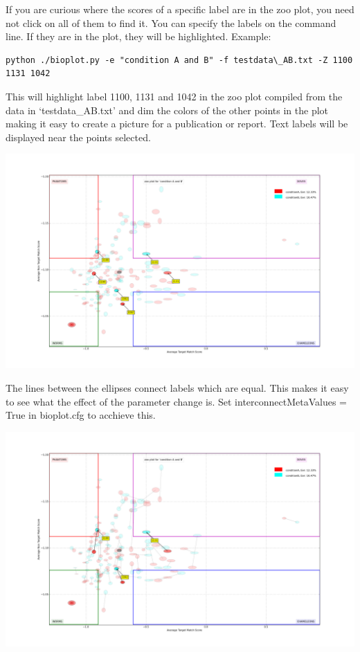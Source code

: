\documentclass[letterpaper,10pt,english]{sphinxmanual}
\begin{document}
If you are curious where the scores of a specific label are in the zoo plot, you need
not click on all of them to find it. You can specify the labels on the command line.
If they are in the plot, they will be highlighted. Example:

\begin{Verbatim}[commandchars=\\\{\}]
python ./bioplot.py -e "condition A and B" -f testdata\_AB.txt -Z 1100 1131 1042
\end{Verbatim}

This will highlight label 1100, 1131 and 1042 in the zoo plot compiled from
the data in `testdata\_AB.txt' and dim the colors of the other points in the plot
making it easy to create a picture for a publication or report. Text labels
will be displayed near the points selected.

\includegraphics{images/condition_A_and_B_zoo_plot.png}

The lines between the ellipses connect labels which are equal. This makes
it easy to see what the effect of the parameter change is. Set interconnectMetaValues = True
in bioplot.cfg to acchieve this.

\includegraphics{images/condition_A_and_B_zoo_plot_01.png}
\end{document}
